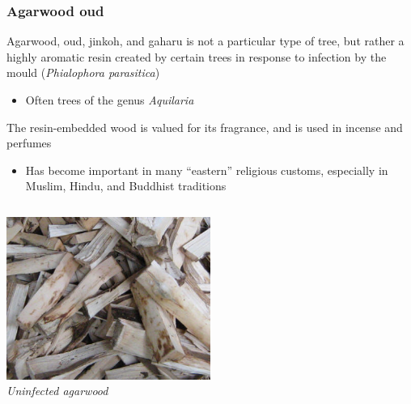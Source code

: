 \documentclass[10pt]{beamer}
\begin{document}
\begin{frame}[t]
\frametitle{Agarwood oud}
\vspace{0.25cm}

	Agarwood, oud, jinkoh, and gaharu is not a particular type of tree, but rather a highly aromatic resin created by certain trees in response to infection by the mould (\emph{Phialophora parasitica})\\
	\smallskip
		\begin{itemize}
			\item Often trees of the genus \emph{Aquilaria}
		\end{itemize}
	
	\vspace{0.4cm}
	
	The resin-embedded wood is valued for its fragrance, and is used in incense and perfumes\\
	\smallskip
		\begin{itemize}
			\item Has become important in many ``eastern'' religious customs, especially in Muslim, Hindu, and Buddhist traditions
		\end{itemize}
	
	\begin{columns}
		\begin{column}{0.5\textwidth}
			\begin{center}
				\includegraphics[width=0.5\textwidth]{figures/agarwood1.jpg}\\
				\emph{Uninfected agarwood}
			\end{center}
		\end{column}
		

\end{columns}
\end{frame}
\end{document}
